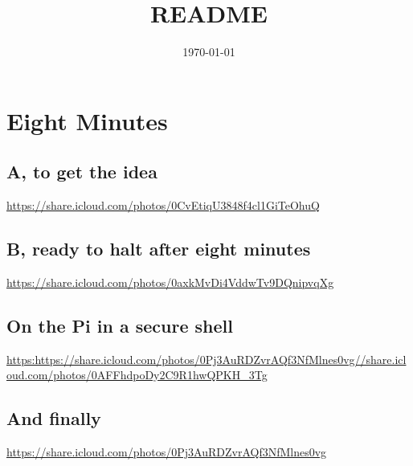 \documentclass[11pt]{article}
\title{README}
\author{}
\date{\today}
\begin{document}
\maketitle

\setcounter{tocdepth}{3}
\tableofcontents
\vspace*{1cm}
\section{Eight Minutes}
\label{sec-1}
\subsection{A, to get the idea}
\label{sec-1-1}

\href{https://share.icloud.com/photos/0CvEtiqU3848f4cl1GiTeOhuQ}{https://share.icloud.com/photos/0CvEtiqU3848f4cl1GiTeOhuQ}
\subsection{B, ready to halt after eight minutes}
\label{sec-1-2}

\href{https://share.icloud.com/photos/0axkMvDi4VddwTv9DQnipvqXg}{https://share.icloud.com/photos/0axkMvDi4VddwTv9DQnipvqXg}
\subsection{On the Pi in a secure shell}
\label{sec-1-3}

\href{https:https://share.icloud.com/photos/0Pj3AuRDZvrAQf3NfMlnes0vg//share.icloud.com/photos/0AFFhdpoDy2C9R1hwQPKH_3Tg}{https:https://share.icloud.com/photos/0Pj3AuRDZvrAQf3NfMlnes0vg//share.icloud.com/photos/0AFFhdpoDy2C9R1hwQPKH\_3Tg}
\subsection{And finally}
\label{sec-1-4}

\href{https://share.icloud.com/photos/0Pj3AuRDZvrAQf3NfMlnes0vg}{https://share.icloud.com/photos/0Pj3AuRDZvrAQf3NfMlnes0vg}
\end{document}

